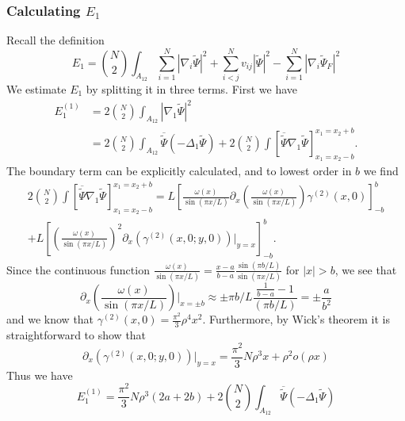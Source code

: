 \documentclass[a4paper,11pt]{article}
\newcommand{\abs}[1]{\left\lvert #1 \right\rvert}
\numberwithin{equation}{section}
\begin{document}
	\subsubsection{Calculating $ E_1 $}
	Recall the definition \begin{equation}
	E_1=\binom{N}{2}\int_{A_{12}} \sum_{i=1}^{N}\abs{\nabla_i\tilde{\Psi}}^2+\sum_{i<j}^{N}v_{ij}\abs{\tilde{\Psi}}^2-\sum_{i=1}^{N}\abs{\nabla_i\tilde{\Psi}_F}^2
	\end{equation}
	We estimate $ E_1 $ by splitting it in three terms. First we have \begin{equation}
	\begin{aligned}
	E_1^{(1)}&=2\binom{N}{2}\int_{A_{12}}\abs{\nabla_1\tilde{\Psi}}^2\\&
	=2\binom{N}{2}\int_{A_{12}}\overline{\tilde{\Psi}}\left( -\Delta_1 \tilde{\Psi} \right)+2\binom{N}{2}\int\left[\overline{\tilde{\Psi}}\nabla_1\tilde{\Psi}\right]_{x_1=x_2-b}^{x_1=x_2+b}.
	\end{aligned}
	\end{equation}
	The boundary term can be explicitly calculated, and to lowest order in $ b $ we find \begin{equation}
	\begin{aligned}
	2\binom{N}{2}\int\left[\overline{\tilde{\Psi}}\nabla_1\tilde{\Psi}\right]_{x_1=x_2-b}^{x_1=x_2+b}=L\left[\frac{\omega(x)}{\sin(\pi x/L)}\partial_x\left(\frac{\omega(x)}{\sin(\pi x/L)}\right)\gamma^{(2)}(x,0)\right]_{-b}^{b}\\+L\left[\left(\frac{\omega(x)}{\sin(\pi x/L)}\right)^2\partial_x\left(\gamma^{(2)}(x,0;y,0)\right)\bigg\vert_{y=x}\right]_{-b}^{b}.
	\end{aligned}
	\end{equation}
	Since the continuous function $ \frac{\omega(x)}{\sin(\pi x/L)}=\frac{x-a}{b-a}\frac{\sin(\pi b/L)}{\sin(\pi x/L)} $ for $ \abs{x}>b $, we see that \begin{equation}
	\partial_x\left(\frac{\omega(x)}{\sin(\pi x/L)}\right)\bigg\vert_{x=\pm b}\approx\pm\pi b/L\frac{\frac{1}{b-a}-1}{(\pi b/L)}=\pm\frac{a}{b^2}
	\end{equation}
	and we know that $ \gamma^{(2)}(x,0)=\frac{\pi^2}{3}\rho^4 x^2 $. Furthermore, by Wick's theorem it is straightforward to show that \begin{equation}\label{EqGammaDeriv.}
	\partial_x\left(\gamma^{(2)}(x,0;y,0)\right)\bigg\vert_{y=x}=\frac{\pi^2}{3}N\rho^3 x + \rho^2 o(\rho x)
	\end{equation}
	Thus we have \begin{equation}
	E_1^{(1)}=\frac{\pi^2}{3}N\rho^3 (2a+2b)+2\binom{N}{2}\int_{A_{12}}\overline{\tilde{\Psi}}(-\Delta_1\tilde{\Psi})
	\end{equation}
\end{document}
